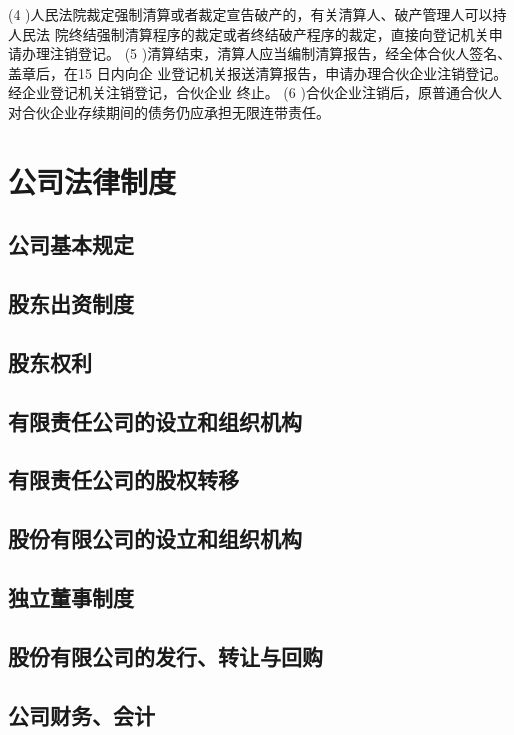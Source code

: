 \documentclass[UTF8,12pt]{ctexart}
\numberwithin{equation}{section} %
\numberwithin{figure}{section}
\numberwithin{table}{section}
\begin{document}
	 (4 )人民法院裁定强制清算或者裁定宣告破产的，有关清算人、破产管理人可以持人民法 院终结强制清算程序的裁定或者终结破产程序的裁定，直接向登记机关申请办理注销登记。 (5 )清算结束，清算人应当编制清算报告，经全体合伙人签名、盖章后，在15 日内向企 业登记机关报送清算报告，申请办理合伙企业注销登记。经企业登记机关注销登记，合伙企业 终止。
	 (6 )合伙企业注销后，原普通合伙人对合伙企业存续期间的债务仍应承担无限连带责任。
	
	    
	
	\newpage
	\section{公司法律制度}
	\subsection{公司基本规定}
	
	
	\subsection{股东出资制度}
	
	\subsection{股东权利}
	
	\subsection{有限责任公司的设立和组织机构}
	
	\subsection{有限责任公司的股权转移}
	
	\subsection{股份有限公司的设立和组织机构}
	
	\subsection{独立董事制度}
	
	\subsection{股份有限公司的发行、转让与回购}
	
	\subsection{公司财务、会计}
	
\end{document}
